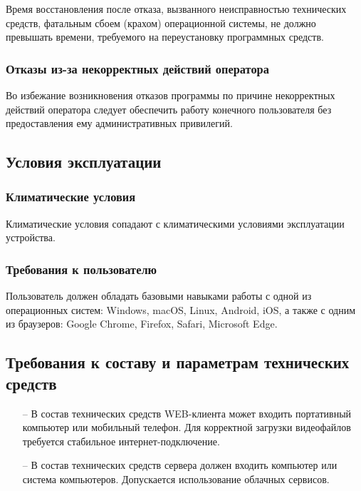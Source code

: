 Время восстановления после отказа, вызванного неисправностью технических средств, фатальным сбоем (крахом) операционной
системы, не должно превышать времени, требуемого на переустановку программных средств.

\subsubsection{Отказы из-за некорректных действий оператора}
Во избежание возникновения отказов программы по причине некорректных действий оператора следует обеспечить работу
конечного пользователя без предоставления ему административных привилегий.

\subsection{Условия эксплуатации}

\subsubsection{Климатические условия}

Климатические условия сопадают с климатическими условиями эксплуатации устройства.

\subsubsection{Требования к пользователю}

Пользователь должен обладать базовыми навыками работы с одной из операционных систем: Windows, macOS, Linux, Android,
iOS, а также с одним из браузеров: Google Chrome, Firefox, Safari, Microsoft Edge.

\subsection{Требования к составу и параметрам технических средств}

\begin{itemize}
    \item[--] В состав технических средств WEB-клиента может входить портативный компьютер или мобильный телефон.
    Для корректной загрузки видеофайлов требуется стабильное интернет-подключение.
    \item[--] В состав технических средств сервера должен входить компьютер или система компьютеров.
    Допускается использование облачных сервисов.
\end{itemize}

